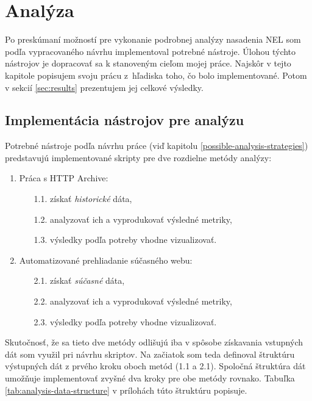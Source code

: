 \chapter{Analýza}
\label{analysis-and-its-results}

Po preskúmaní možností pre vykonanie podrobnej analýzy nasadenia NEL som podľa vypracovaného návrhu implementoval potrebné nástroje.
Úlohou týchto nástrojov je dopracovať sa k stanoveným cieľom mojej práce.  
Najskôr v tejto kapitole popisujem svoju prácu \mbox{z hľadiska} toho, čo bolo implementované.
Potom v sekcií \ref{sec:results} prezentujem jej celkové výsledky.


\section{Implementácia nástrojov pre analýzu}

Potrebné nástroje podľa návrhu práce (viď kapitolu \ref{possible-analysis-strategies}) predstavujú implementované skripty pre dve rozdielne metódy analýzy:
\begin{enumerate}
    \item Práca s HTTP Archive:
    \begin{enumerate}
        \item[1.1.] získať \textit{historické} dáta, 
        \item[1.2.] analyzovať ich a vyprodukovať výsledné metriky,
        \item[1.3.] výsledky podľa potreby vhodne vizualizovať.
    \end{enumerate}

    \item Automatizované prehliadanie súčasného webu:
    \begin{enumerate}
        \item[2.1.] získať \textit{súčasné} dáta,
        \item[2.2.] analyzovať ich a vyprodukovať výsledné metriky, 
        \item[2.3.] výsledky podľa potreby vhodne vizualizovať.
    \end{enumerate}
\end{enumerate}

Skutočnosť, že sa tieto dve metódy odlišujú iba v spôsobe získavania vstupných dát som využil pri návrhu skriptov.
Na začiatok som teda definoval štruktúru výstupných dát z prvého kroku oboch metód (1.1 a 2.1).
Spoločná štruktúra dát umožňuje implementovať zvyšné dva kroky pre obe metódy rovnako.
Tabuľka \ref{tab:analysis-data-structure} v prílohách túto štruktúru popisuje. 


